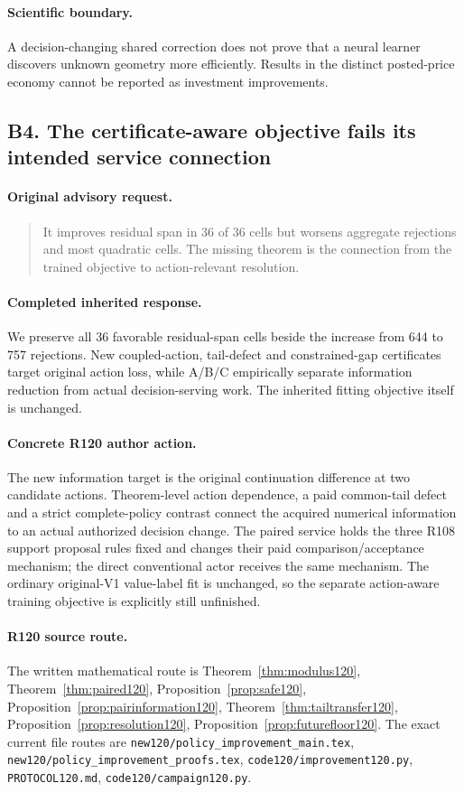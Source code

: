 \paragraph{Scientific boundary.}
A decision-changing shared correction does not prove that a neural learner discovers unknown geometry more efficiently. Results in the distinct posted-price economy cannot be reported as investment improvements.

\subsection{B4. The certificate-aware objective fails its intended service connection}
\label{response120:B4}
\paragraph{Original advisory request.}
\begin{quote}
It improves residual span in 36 of 36 cells but worsens aggregate rejections and most quadratic cells. The missing theorem is the connection from the trained objective to action-relevant resolution.
\end{quote}
\paragraph{Completed inherited response.}
We preserve all 36 favorable residual-span cells beside the increase from 644 to 757 rejections. New coupled-action, tail-defect and constrained-gap certificates target original action loss, while A/B/C empirically separate information reduction from actual decision-serving work. The inherited fitting objective itself is unchanged.
\paragraph{Concrete R120 author action.}
The new information target is the original continuation difference at two candidate actions. Theorem-level action dependence, a paid common-tail defect and a strict complete-policy contrast connect the acquired numerical information to an actual authorized decision change. The paired service holds the three R108 support proposal rules fixed and changes their paid comparison/acceptance mechanism; the direct conventional actor receives the same mechanism. The ordinary original-V1 value-label fit is unchanged, so the separate action-aware training objective is explicitly still unfinished.
\paragraph{R120 source route.}
The written mathematical route is Theorem~\ref{thm:modulus120}, Theorem~\ref{thm:paired120}, Proposition~\ref{prop:safe120}, Proposition~\ref{prop:pairinformation120}, Theorem~\ref{thm:tailtransfer120}, Proposition~\ref{prop:resolution120}, Proposition~\ref{prop:futurefloor120}. The exact current file routes are \nolinkurl{new120/policy_improvement_main.tex}, \nolinkurl{new120/policy_improvement_proofs.tex}, \nolinkurl{code120/improvement120.py}, \nolinkurl{PROTOCOL120.md}, \nolinkurl{code120/campaign120.py}.
